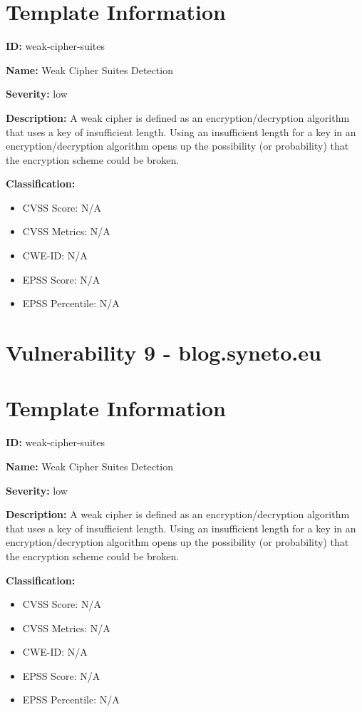 \section*{Template Information}
\textbf{ID:} weak-cipher-suites

\textbf{Name:} Weak Cipher Suites Detection

\textbf{Severity:} low

\textbf{Description:} A weak cipher is defined as an encryption/decryption algorithm that uses a key of insufficient length. Using an insufficient length for a key in an encryption/decryption algorithm opens up the possibility (or probability) that the encryption scheme could be broken.

\textbf{Classification:}
\begin{itemize}
\item CVSS Score: N/A
\item CVSS Metrics: N/A
\item CWE-ID: N/A
\item EPSS Score: N/A
\item EPSS Percentile: N/A
\end{itemize}



\section*{Vulnerability 9 - blog.syneto.eu}

\section*{Template Information}
\textbf{ID:} weak-cipher-suites

\textbf{Name:} Weak Cipher Suites Detection

\textbf{Severity:} low

\textbf{Description:} A weak cipher is defined as an encryption/decryption algorithm that uses a key of insufficient length. Using an insufficient length for a key in an encryption/decryption algorithm opens up the possibility (or probability) that the encryption scheme could be broken.

\textbf{Classification:}
\begin{itemize}
\item CVSS Score: N/A
\item CVSS Metrics: N/A
\item CWE-ID: N/A
\item EPSS Score: N/A
\item EPSS Percentile: N/A
\end{itemize}



